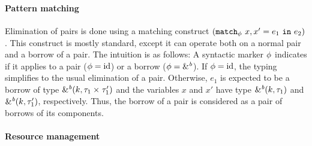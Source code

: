 





\paragraph{Pattern matching}
\label{sdtyping:matching}

Elimination of pairs is done using a matching construct
$(\mathtt{match}_{\phi}\ x,x' = e_1\ \mathtt{in}\ e_2)$.
This construct is mostly standard, except it can operate both
on a normal pair and a borrow of a pair.
The intuition is as follows:
A syntactic marker $\phi$ indicates if it applies to
a pair ($\phi = \operatorname{id}$) or a borrow ($\phi = \&^{\textit{b}}$).
If $\phi = \operatorname{id}$, the typing simplifies to
the usual elimination of a pair.
Otherwise, $e_1$ is expected to be a borrow of type
${\&}^{\textit{b}}(k,\tau_1 \times^{{}} \tau'_1)$
and the variables $x$ and $x'$ have type
${\&}^{\textit{b}}(k,\tau_1)$ and ${\&}^{\textit{b}}(k,\tau'_1)$,
respectively. Thus, the borrow of a pair is considered as a pair of
borrows of its components.



\paragraph{Resource management}

